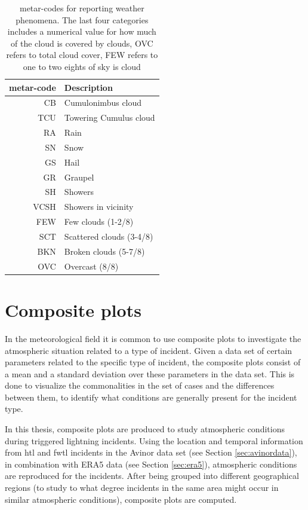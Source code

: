\begin{table}
    \centering
    \begin{tabular}{r|l}
        \acrshort{metar}-code & Description \\
        \hline
        CB & Cumulonimbus cloud \\
        TCU & Towering Cumulus cloud\\
        RA & Rain \\
        SN & Snow  \\
        GS & Hail \\
        GR & Graupel \\
        SH & Showers    \\
        VCSH & Showers in vicinity \\
        FEW & Few clouds (1-2/8)\\
        SCT & Scattered clouds (3-4/8)\\
        BKN & Broken clouds (5-7/8)\\
        OVC & Overcast (8/8)\\
    \end{tabular}
    \caption{\acrshort{metar}-codes for reporting weather phenomena. The last four categories includes a numerical value for how much of the cloud is covered by clouds, OVC refers to total cloud cover, FEW refers to one to two eights of sky is cloud }
    \label{tab:METAR-table}
\end{table}

\section{Composite plots}\label{sec:composite}
In the meteorological field it is common to use composite plots to investigate the atmospheric situation related to a type of incident. Given a data set of certain parameters related to the specific type of incident, the composite plots consist of a mean and a standard deviation over these parameters in the data set. This is done to visualize the commonalities in the set of cases and the differences between them, to identify what conditions are generally present for the incident type. 

In this thesis, composite plots are produced to study atmospheric conditions during triggered lightning incidents. Using the location and temporal information from \acrshort{htl} and \acrshort{fwtl} incidents in the Avinor data set (see Section \ref{sec:avinordata}), in combination with ERA5 data (see Section \ref{sec:era5}), atmospheric conditions are reproduced for the incidents. After being grouped into different geographical regions (to study to what degree incidents in the same area might occur in similar atmospheric conditions), composite plots are computed.

